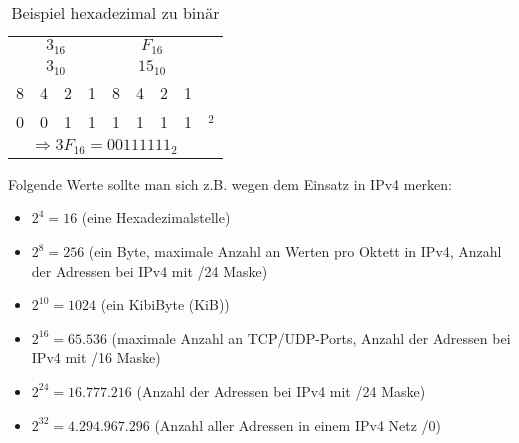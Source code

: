 \begin{table}
    [H]\centering
    \begin{tabular}{cccc|ccccl}
        \multicolumn{4}{c|}{$3_{16}$}                            & \multicolumn{4}{c}{$F_{16}$}  &                              \\
        \multicolumn{4}{c|}{$3_{10}$}                            & \multicolumn{4}{c}{$15_{10}$} &                              \\
        8                                                        & 4                             & 2 & 1 & 8 & 4 & 2 & 1 &      \\
        0                                                        & 0                             & 1 & 1 & 1 & 1 & 1 & 1 & $_2$ \\\hline
        \multicolumn{8}{c}{$\Rightarrow 3F_{16} = 00111111_{2}$} &
    \end{tabular}
    \caption{Beispiel hexadezimal zu binär}
\end{table}

Folgende Werte sollte man sich z.B. wegen dem Einsatz in IPv4 merken:

\begin{itemize}
    \item $2^4 = 16$ (eine Hexadezimalstelle)
    \item $2^8 = 256$ (ein Byte, maximale Anzahl an Werten pro Oktett in IPv4, Anzahl der Adressen bei IPv4 mit /24 Maske)
    \item $2^{10} = 1024$ (ein KibiByte (KiB))
    \item $2^{16} = 65.536$ (maximale Anzahl an TCP/UDP-Ports, Anzahl der Adressen bei IPv4 mit /16 Maske)
    \item $2^{24} = 16.777.216$ (Anzahl der Adressen bei IPv4 mit /24 Maske)
    \item $2^{32} = 4.294.967.296$ (Anzahl aller Adressen in einem IPv4 Netz /0)
\end{itemize}